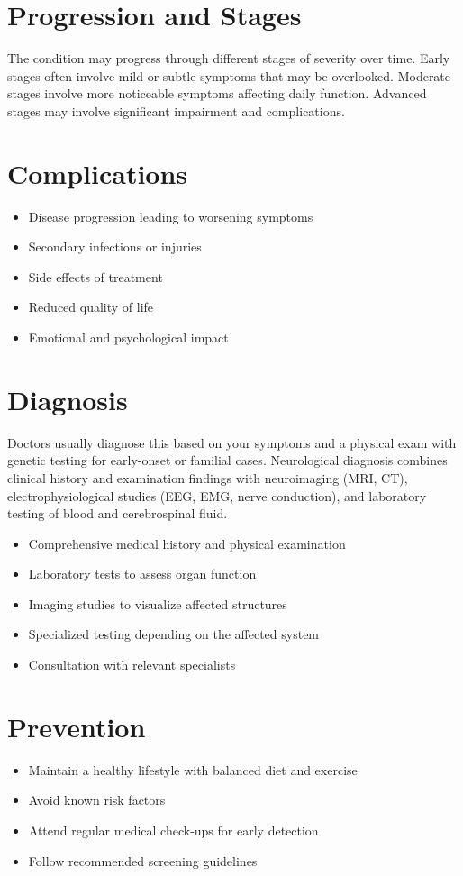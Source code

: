 \section{Progression and Stages}
The condition may progress through different stages of severity over time. Early stages often involve mild or subtle symptoms that may be overlooked. Moderate stages involve more noticeable symptoms affecting daily function. Advanced stages may involve significant impairment and complications.
\section{Complications}
\begin{itemize}[noitemsep]
  \item Disease progression leading to worsening symptoms
  \item Secondary infections or injuries
  \item Side effects of treatment
  \item Reduced quality of life
  \item Emotional and psychological impact
\end{itemize}
\section{Diagnosis}
Doctors usually diagnose this based on your symptoms and a physical exam with genetic testing for early-onset or familial cases. Neurological diagnosis combines clinical history and examination findings with neuroimaging (MRI, CT), electrophysiological studies (EEG, EMG, nerve conduction), and laboratory testing of blood and cerebrospinal fluid.

\begin{itemize}[noitemsep]
  \item Comprehensive medical history and physical examination
  \item Laboratory tests to assess organ function
  \item Imaging studies to visualize affected structures
  \item Specialized testing depending on the affected system
  \item Consultation with relevant specialists
\end{itemize}
\section{Prevention}
\begin{itemize}[noitemsep]
  \item Maintain a healthy lifestyle with balanced diet and exercise
  \item Avoid known risk factors
  \item Attend regular medical check-ups for early detection
  \item Follow recommended screening guidelines
\end{itemize}
